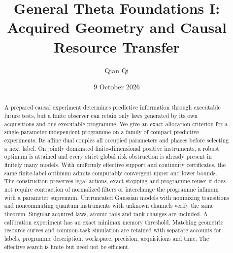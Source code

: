 \documentclass[11pt]{amsart}
\title{General Theta Foundations I:\\Acquired Geometry and Causal Resource Transfer}
\author{Qian Qi}\date{9 October 2026}
\theoremstyle{definition}\newtheorem{definition}[theorem]{Definition}
\theoremstyle{remark}\newtheorem{remark}[theorem]{Remark}
\begin{document}
\begin{abstract}
A prepared causal experiment determines predictive information through executable future tests, but a finite observer can retain only laws generated by its own acquisitions and one executable programme. We give an exact allocation criterion for a single parameter-independent programme on a family of compact predictive experiments. Its affine dual couples all occupied parameters and phases before selecting a next label. On jointly dominated finite-dimensional positive instruments, a robust optimum is attained and every strict global risk obstruction is already present in finitely many models. With uniformly effective support and continuity certificates, the same finite-label optimum admits computably convergent upper and lower bounds. The construction preserves legal actions, exact stopping and programme reuse; it does not require contraction of normalized filters or interchange the programme infimum with a parameter supremum. Untruncated Gaussian models with nonmixing transitions and noncommuting quantum instruments with unknown channels verify the same theorem. Singular acquired laws, atomic tails and rank changes are included. A calibration experiment has an exact minimax memory threshold. Matching geometric resource curves and common-task simulation are retained with separate accounts for labels, programme description, workspace, precision, acquisitions and time. The effective search is finite but need not be efficient.
\end{abstract}
\maketitle














\appendix


\end{document}
